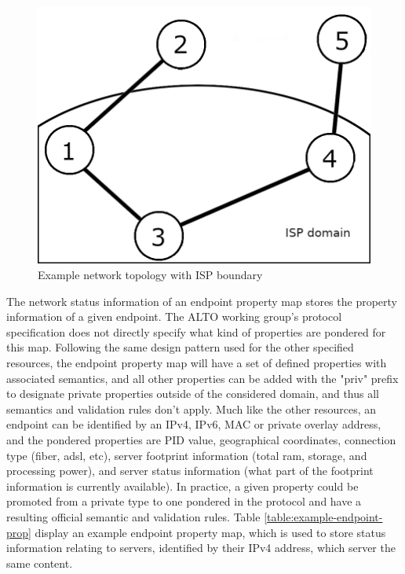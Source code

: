 \begin{figure}[!h]
        \centering
        \includegraphics[scale=1.00]{img/topology-boundary.png}
        \caption{Example network topology with ISP boundary}
        \label{fig:example-topology-boundary}
\end{figure}

    The network status information of an endpoint property map stores the property information of a given endpoint.
    The ALTO working group's protocol specification \cite{alto-protocol} does not directly specify what kind of properties are pondered for this map.
    Following the same design pattern used for the other specified resources, the endpoint property map will have a set of defined properties with associated semantics, and all other properties can be added with the "priv" prefix to designate private properties outside of the considered domain, and thus all semantics and validation rules don't apply.
    Much like the other resources, an endpoint can be identified by an IPv4, IPv6, MAC or private overlay address, and the pondered properties are PID value, geographical coordinates, connection type (fiber, adsl, etc), server footprint information (total ram, storage, and processing power), and server status information (what part of the footprint information is currently available).
    In practice, a given property could be promoted from a private type to one pondered in the protocol and have a resulting official semantic and validation rules.
    Table \ref{table:example-endpoint-prop} display an example endpoint property map, which is used to store status information relating to servers, identified by their IPv4 address, which server the same content.

